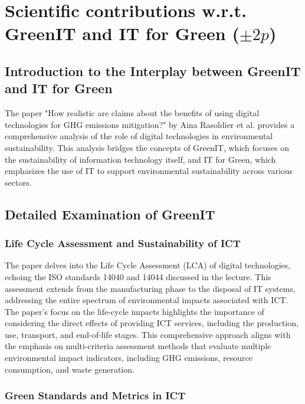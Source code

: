\documentclass[conference,compsoc]{IEEEtran}
\begin{document}
\section{Scientific contributions w.r.t. GreenIT and IT for Green ($\pm 2p$)}

\subsection{Introduction to the Interplay between GreenIT and IT for Green}

The paper "How realistic are claims about the benefits of using digital technologies for GHG emissions mitigation?" by Aina Rasoldier et al. provides a comprehensive analysis of the role of digital technologies in environmental sustainability. This analysis bridges the concepts of GreenIT, which focuses on the sustainability of information technology itself, and IT for Green, which emphasizes the use of IT to support environmental sustainability across various sectors.

\subsection{Detailed Examination of GreenIT}

\subsubsection{Life Cycle Assessment and Sustainability of ICT}

The paper delves into the Life Cycle Assessment (LCA) of digital technologies, echoing the ISO standards 14040 and 14044 discussed in the lecture. This assessment extends from the manufacturing phase to the disposal of IT systems, addressing the entire spectrum of environmental impacts associated with ICT. The paper’s focus on the life-cycle impacts highlights the importance of considering the direct effects of providing ICT services, including the production, use, transport, and end-of-life stages. This comprehensive approach aligns with the  emphasis on multi-criteria assessment methods that evaluate multiple environmental impact indicators, including GHG emissions, resource consumption, and waste generation.

\subsubsection{Green Standards and Metrics in ICT}
\end{document}
